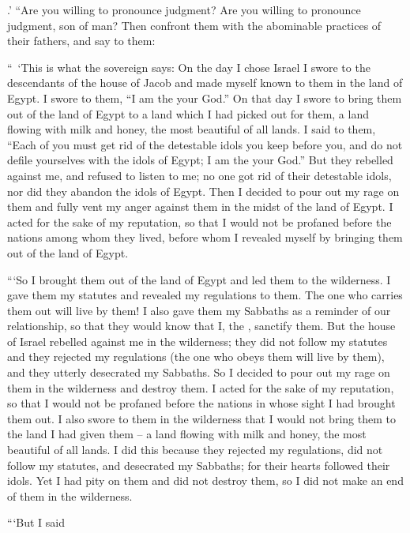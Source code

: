 {{}.’
“Are you willing to pronounce
judgment? Are you willing to pronounce judgment,
son
of man? Then confront
them with the abominable practices
of their fathers,
and say
to them:
\par }{\PP “ ‘This is what
the sovereign
{}
says: On the day
I chose
Israel
I swore
to the descendants
of the house
of Jacob
and made myself known
to them in the land
of Egypt.
I swore
to them, “I am
the
{}
your God.”
On that day
I swore
to bring them out
of the land
of Egypt
to
a land
which
I had picked
out for them, a land flowing
with milk
and honey,
the most beautiful
of all
lands.
I said
to
them, “Each
of you must get rid of
the detestable idols
you keep before you,
and do not
defile
yourselves with the idols
of Egypt;
I
am the
{}
your God.”
But they rebelled
against me, and refused
to listen
to
me; no one
got rid of
their detestable
idols,
nor
did they abandon
the idols
of Egypt.
Then I decided to pour out
my rage
on
them and fully vent
my anger
against them in the midst
of the land
of Egypt.
I acted
for the sake
of my reputation,
so that I would not
be profaned
before
the nations
among
whom
they
lived,
before
whom
I revealed
myself by bringing
them
out
of the land
of Egypt.
\par }{\PP {}“‘So I brought
them out
of the land
of Egypt
and led
them to
the wilderness.
I gave
them my statutes
and revealed
my regulations
to them. The one
who
carries
them out will live by them!
I also
gave
them my Sabbaths
as a reminder
of our relationship,
so that they would know
that
I,
the {},
sanctify them.
But the house
of Israel
rebelled
against me in the wilderness;
they did not
follow
my statutes
and they rejected
my regulations
(the one
who obeys
them will live
by them), and they utterly
desecrated
my Sabbaths.
So I decided
to pour out
my rage
on
them in the wilderness
and destroy them.
I acted
for the sake
of my reputation,
so that I would not
be profaned
before
the nations
in whose
sight
I had brought them out.
I
also
swore
to them in the wilderness
that I would not
bring
them to
the land
I had
given them – a land flowing with milk and honey, the most beautiful of all lands.
I did this because
they rejected
my regulations,
did not
follow
my statutes,
and desecrated
my Sabbaths;
for
their
hearts
followed
their idols.
Yet I had pity
on
them and did not destroy
them, so I did not
make
an end
of them in the wilderness.
\par }{\PP {}“‘But I said
}
